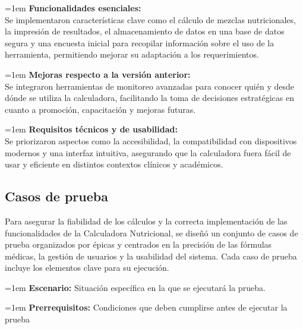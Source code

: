 \documentclass[12pt,letterpaper,spanish, xcolor=table]{report}
\numberwithin{figure}{subsection}
\begin{document}
	{\leftskip=1em 
	\noindent 
	\textbf{Funcionalidades esenciales:}\\
	Se implementaron características clave como el cálculo de mezclas nutricionales, la impresión de resultados, el almacenamiento de datos en una base de datos segura y una encuesta inicial para recopilar información sobre el uso de la herramienta, permitiendo mejorar su adaptación a los requerimientos.\\
	\par}
	
	{\leftskip=1em 
	\noindent 
	\textbf{Mejoras respecto a la versión anterior:}\\
	Se integraron herramientas de monitoreo avanzadas para conocer quién y desde dónde se utiliza la calculadora, facilitando la toma de decisiones estratégicas en cuanto a promoción, capacitación y mejoras futuras.\\
	\par}
	
	{\leftskip=1em 
	\noindent 
	\textbf{Requisitos técnicos y de usabilidad:}\\
	Se priorizaron aspectos como la accesibilidad, la compatibilidad con dispositivos modernos y una interfaz intuitiva, asegurando que la calculadora fuera fácil de usar y eficiente en distintos contextos clínicos y académicos.\\
	\par}
	

\subsection{Casos de prueba}
	
	Para asegurar la fiabilidad de los cálculos y la correcta implementación de las funcionalidades de la Calculadora Nutricional, se diseñó un conjunto de casos de prueba organizados por épicas y centrados en la precisión de las fórmulas médicas, la gestión de usuarios y la usabilidad del sistema. Cada caso de prueba incluye los elementos clave para su ejecución.\\
	
	

	{\leftskip=1em 
		\noindent 
		\textbf{Escenario:} Situación específica en la que se ejecutará la prueba.
		\par}
	
	{\leftskip=1em 
		\noindent 
		\textbf{Prerrequisitos:} Condiciones que deben cumplirse antes de ejecutar la prueba
		\par}
	
\end{document}
